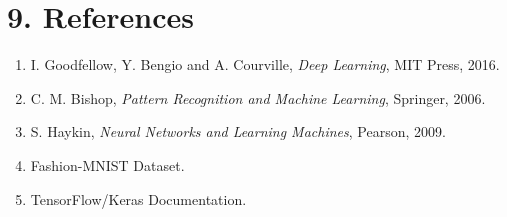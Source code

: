 \documentclass[11pt]{article}
\begin{document}
\section*{9. References}
\begin{enumerate}
\item I. Goodfellow, Y. Bengio and A. Courville, \emph{Deep Learning}, MIT Press, 2016.
\item C. M. Bishop, \emph{Pattern Recognition and Machine Learning}, Springer, 2006.
\item S. Haykin, \emph{Neural Networks and Learning Machines}, Pearson, 2009.
\item Fashion-MNIST Dataset.
\item TensorFlow/Keras Documentation.
\end{enumerate}
\end{document}
